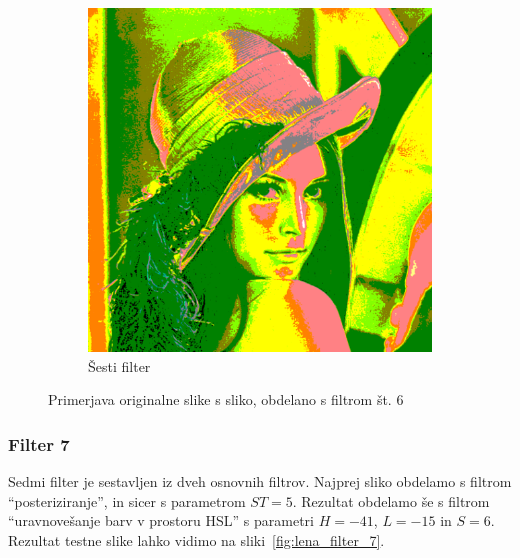 \documentclass[a4paper, 12pt]{book}
\begin{document}
\begin{figure}[!ht]
\begin{subfigure}[b]{0.4\textwidth}
        \includegraphics[width=\textwidth]{lena_filter_6}
        \caption{Šesti filter}
    \end{subfigure}
    \caption{Primerjava originalne slike s sliko, obdelano s filtrom št. 6}
    \label{fig:lena_filter_6}
\end{figure}


\subsubsection*{Filter 7}
Sedmi filter je sestavljen iz dveh osnovnih filtrov. Najprej sliko obdelamo s
filtrom ``posteriziranje'', in sicer s parametrom $ST = 5$. Rezultat obdelamo
še s filtrom ``uravnovešanje barv v prostoru HSL'' s parametri $H = -41$,
$L = -15$ in $S = 6$. Rezultat testne slike lahko vidimo na
sliki~\ref{fig:lena_filter_7}.
\end{document}
